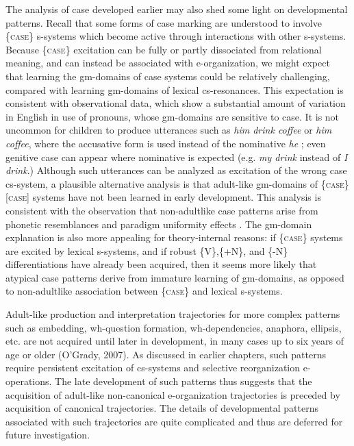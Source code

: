   The analysis of case developed earlier may also shed some light on developmental patterns. Recall that some forms of case marking are understood to involve \{\textsc{case}\} s-systems which become active through interactions with other s-systems. Because \{\textsc{case}\} excitation can be fully or partly dissociated from relational meaning, and can instead be associated with e-organization, we might expect that learning the gm-domains of case systems could be relatively challenging, compared with learning gm-domains of lexical cs-resonances. This expectation is consistent with observational data, which show a substantial amount of variation in English in use of pronouns, whose gm-domains are sensitive to case. It is not uncommon for children to produce utterances such as \textit{him drink coffee} or \textit{him coffee}, where the accusative form is used instead of the nominative \textit{he} \citep{Radford1990}; even genitive case can appear where nominative is expected (e.g. \textit{my drink} instead of \textit{I drink}.) Although such utterances can be analyzed as excitation of the wrong case cs-system, a plausible alternative analysis is that adult-like gm-domains of \{\textsc{case}\}[\textsc{case}] systems have not been learned in early development. This analysis is consistent with the observation that non-adultlike case patterns arise from phonetic resemblances and paradigm uniformity effects \citep{Rispoli1994}. The gm-domain explanation is also more appealing for theory-internal reasons: if \{\textsc{case}\} systems are excited by lexical s-systems, and if robust \{V\},\{+N\}, and \{-N\} differentiations have already been acquired, then it seems more likely that atypical case patterns derive from immature learning of gm-domains, as opposed to non-adultlike association between \{\textsc{case}\} and lexical s-systems. 

  Adult-like production and interpretation trajectories for more complex patterns such as embedding, wh-question formation, wh-dependencies, anaphora, ellipsis, etc. are not acquired until later in development, in many cases up to six years of age or older (O’Grady, 2007). As discussed in earlier chapters, such patterns require persistent excitation of cs-systems and selective reorganization e-operations. The late development of such patterns thus suggests that the acquisition of adult-like non-canonical e-organization trajectories is preceded by acquisition of canonical trajectories. The details of developmental patterns associated with such trajectories are quite complicated and thus are deferred for future investigation.

